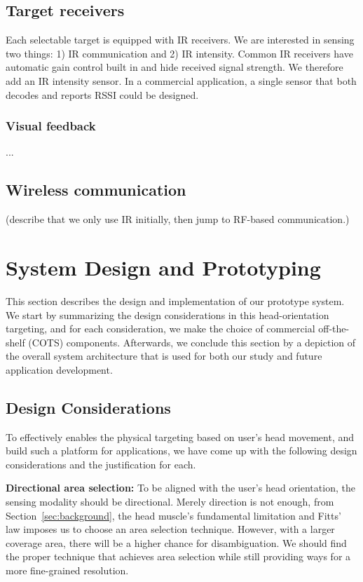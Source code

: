 \subsection{Target receivers}
Each selectable target is equipped with IR receivers. We are interested in sensing two things: 1) IR communication and 2) IR intensity. Common IR receivers have automatic gain control built in and hide received signal strength. We therefore add an IR intensity sensor. In a commercial application, a single sensor that both decodes and reports RSSI could be designed.
\subsubsection{Visual feedback}
...
\subsection{Wireless communication}
(describe that we only use IR initially, then jump to RF-based communication.)

\section{System Design and Prototyping}
\label{sec:syst-design-prot}

This section describes the design and implementation of our prototype system. We start by summarizing the design considerations in this head-orientation targeting, and for each consideration, we make the choice of commercial off-the-shelf (COTS) components. Afterwards, we conclude this section by a depiction of the overall system architecture that is used for both our study and future application development. 

\subsection{Design Considerations}
\label{sec:design-cons}

To effectively enables the physical targeting based on user's head movement, and build such a platform for applications, we have come up with the following design considerations and the justification for each.

{\bf Directional area selection:} To be aligned with the user's head orientation, the sensing modality should be directional. Merely direction is not enough, from Section~\ref{sec:background}, the head muscle's fundamental limitation and Fitts' law imposes us to choose an area selection technique. However,  with a larger coverage area, there will be a higher chance for disambiguation. We should find the proper technique that achieves area selection while still providing ways for a more fine-grained resolution.

